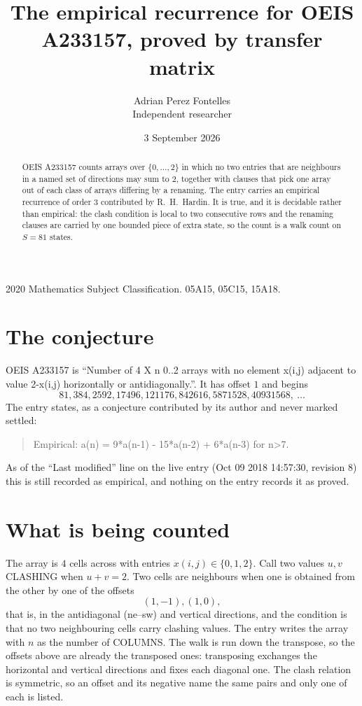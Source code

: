 \documentclass[11pt,a4paper]{article}
\title{The empirical recurrence for OEIS A233157, proved by transfer matrix}
\author{Adrian Perez Fontelles\\ \small Independent researcher}
\date{3 September 2026}
\theoremstyle{plain}
\theoremstyle{definition}
\begin{document}
\maketitle

\begin{abstract}
OEIS A233157 counts arrays over $\{0,\dots,2\}$ in which no two entries that are neighbours in
a named set of directions may sum to $2$, together with clauses that pick one array out of
each class of arrays differing by a renaming. The entry carries an empirical recurrence of
order $3$ contributed by R.~H.~Hardin. It is true, and it is decidable rather than
empirical: the clash condition is local to two consecutive rows and the renaming clauses are
carried by one bounded piece of extra state, so the count is a walk count on $S=81$ states.
\end{abstract}

\noindent\small 2020 Mathematics Subject Classification. 05A15, 05C15, 15A18.\normalsize

\section{The conjecture}

OEIS A233157 is ``Number of 4 X n 0..2 arrays with no element x(i,j) adjacent to value 2-x(i,j) horizontally or antidiagonally.''. It has offset $1$ and begins
\[
81, 384, 2592, 17496, 121176, 842616, 5871528, 40931568,\ \dots
\]
The entry states, as a conjecture contributed by its author and never marked settled:
\begin{quote}
Empirical: a(n) = 9*a(n-1) - 15*a(n-2) + 6*a(n-3) for n>7.
\end{quote}
As of the ``Last modified'' line on the live entry (Oct 09 2018 14:57:30, revision 8) this is still
recorded as empirical, and nothing on the entry records it as proved.

\section{What is being counted}

The array is $4$ cells across with entries $x(i,j)\in\{0,1,2\}$. Call two values $u,v$ CLASHING
when $u+v=2$. Two cells are neighbours when one is obtained from the other by one of
the offsets
\[
(1,-1), (1,0),
\]
that is, in the antidiagonal (ne--sw) and vertical directions, and the condition is that no two neighbouring cells carry
clashing values. The entry writes the array with $n$ as the number of COLUMNS. The walk is run down the transpose, so the offsets above are already the transposed ones: transposing exchanges the horizontal and vertical directions and fixes each diagonal one. The clash relation is symmetric, so an offset and its negative name the
same pairs and only one of each is listed.
\end{document}

